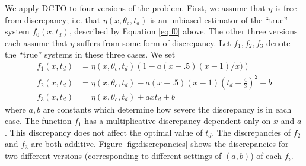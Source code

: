 \documentclass[10pt]{asme2ej}
\begin{document}
% 
We apply DCTO to four versions of the problem.
%
First, we assume that $\eta$ is free from discrepancy; i.e. that $\eta(x,\theta_c,t_d)$ is an unbiased estimator of the ``true'' system $f_0(x,t_d)$, described by Equation \ref{eq:f0} above.
%
The other three versions each assume that $\eta$ suffers from some form of discrepancy.
%
Let $f_1,f_2,f_3$ denote the ``true'' systems in these three cases.
%
We set 
%
\begin{align}
	f_1(x,t_d) &= \eta(x,\theta_c,t_d) \left(1-a(x-.5)(x-1)/x) \right)\label{eq:objs1} \\
	f_2(x,t_d)&= \eta(x,\theta_c,t_d) - a(x-.5)(x-1)\left(t_d-\frac43\right)^2 + b\label{eq:objs2}\\
	f_3(x,t_d)&=\eta(x,\theta_c,t_d) + axt_d+b\label{eq:objs3}
\end{align}
%
where $a,b$ are constants which determine how severe the discrepancy is in each case. 
%
The function $f_1$ has a multiplicative discrepancy dependent only on $x$ and $a$. 
%
This discrepancy does not affect the optimal value of $t_d$.  
%
The discrepancies of $f_2$ and $f_3$ are both additive.
%
Figure \ref{fig:discrepancies} shows the discrepancies for two different versions (corresponding to different settings of $(a,b)$) of each $f_i$.
%
\end{document}
